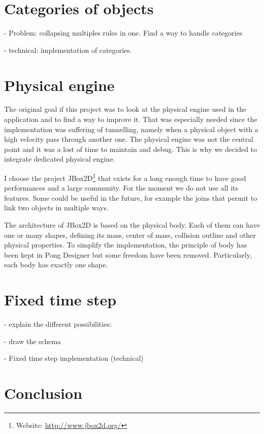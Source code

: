 \documentclass[11pt,a4paper]{article}
\begin{document}
\section{Categories of objects}

- Problem: collapsing multiples rules in one. Find a way to handle categories

- technical: implementation of categories.

\section{Physical engine}
The original goal if this project was to look at the physical engine used in the application and to find a way to improve it. That was especially needed since the implementation was suffering of tunnelling, namely when a physical object with a high velocity pass through another one. The physical engine was not the central point and it was a lost of time to maintain and debug. This is why we decided to integrate dedicated physical engine. 

I choose the project JBox2D\footnote{Website: \url{http://www.jbox2d.org/}} that exists for a long enough time to have good performances and a large community. For the moment we do not use all its features. Some could be useful in the future, for example the joins that permit to link two objects in multiple ways.

The architecture of JBox2D is based on the physical body. Each of them can have one or many shapes, defining its mass, center of mass, collision outline and other physical properties. To simplify the implementation, the principle of body has been kept in Pong Designer but some freedom have been removed. Particularly, each body has exactly one shape.

\section{Fixed time step}

- explain the different possibilities:
  
- draw the schema

- Fixed time step implementation (technical)



\section{Conclusion}
\end{document}
